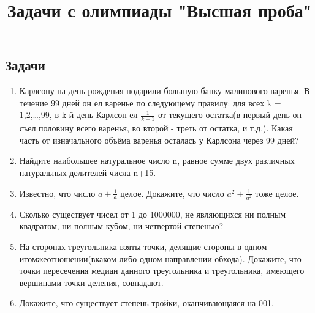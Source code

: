 \documentclass[a4paper,12pt]{article}
\title{Задачи с олимпиады "Высшая проба"}
\begin{document}
\maketitle
    \subsection*{Задачи}
    \begin{enumerate}
        \item Карлсону на день рождения подарили большую банку малинового варенья. В течение 99 дней он ел варенье по следующему правилу: для всех k = 1,2,…,99, в k-й день Карлсон ел $\frac{1}{k + 1}$ от текущего остатка(в первый день он съел половину всего варенья, во второй - треть от остатка, и т.д.). Какая часть от изначального объёма варенья осталась у Карлсона через 99 дней?
        \item Найдите наибольшее натуральное число n, равное сумме двух различных натуральных делителей числа n+15.  
        \item Известно, что число $a + \frac{1}{a}$ целое. Докажите, что число $a^2 + \frac{1}{a^2}$ тоже целое.
        \item Сколько существует чисел от 1 до 1000000, не являющихся ни полным квадратом, ни полным кубом, ни четвертой степенью?
        \item На сторонах треугольника взяты точки, делящие стороны в одном итомжеотношении(вкаком-либо одном направлении обхода). Докажите, что точки пересечения медиан данного треугольника и треугольника, имеющего вершинами точки деления, совпадают.
        \item Докажите, что существует степень тройки, оканчивающаяся на 001.
    \end{enumerate}
\end{document}
